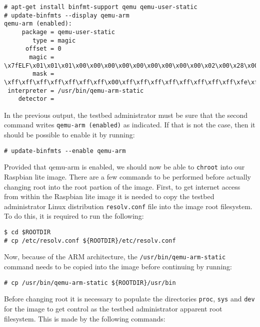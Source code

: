 \begin{lstlisting}[]
# apt-get install binfmt-support qemu qemu-user-static
# update-binfmts --display qemu-arm
qemu-arm (enabled):
     package = qemu-user-static
        type = magic
      offset = 0
       magic = \x7fELF\x01\x01\x01\x00\x00\x00\x00\x00\x00\x00\x00\x00\x02\x00\x28\x00
        mask = \xff\xff\xff\xff\xff\xff\xff\x00\xff\xff\xff\xff\xff\xff\xff\xff\xfe\xff\xff\xff
 interpreter = /usr/bin/qemu-arm-static
    detector =
\end{lstlisting}
\FloatBarrier
\vspace{-5mm}

In the previous output, the testbed administrator must be sure that the second
command writes \texttt{qemu-arm (enabled)} as indicated. If that is not the
case, then it should be possible to enable it by running:

\begin{lstlisting}[]
# update-binfmts --enable qemu-arm
\end{lstlisting}
\FloatBarrier
\vspace{-5mm}

Provided that qemu-arm is enabled, we should now be able to \texttt{chroot}
into our Raspbian lite image. There are a few commands to be
performed before actually changing root into the root partion of the image.
First, to get internet access from within the Raspbian lite image it is needed
to copy the testbed administrator Linux distribution \texttt{resolv.conf} file
into the image root filesystem. To do this, it is required to run the
following:

\begin{lstlisting}[]
$ cd $ROOTDIR
# cp /etc/resolv.conf ${ROOTDIR}/etc/resolv.conf
\end{lstlisting}
\FloatBarrier
\vspace{-5mm}

Now, because of the \ac{ARM} architecture, the
\texttt{/usr/bin/qemu-arm-static} command needs to be copied into the
image before continuing by running:

\begin{lstlisting}[]
# cp /usr/bin/qemu-arm-static ${ROOTDIR}/usr/bin
\end{lstlisting}
\FloatBarrier
\vspace{-5mm}

Before changing root it is necessary to populate the directories
\texttt{proc}, \texttt{sys} and \texttt{dev} for the image to get control
as the testbed administrator apparent root filesystem. This is made by the
following commands:

